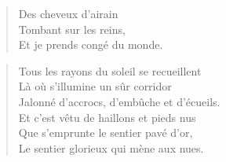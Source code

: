 \begin{verse}\haikuII
  Des cheveux d’airain\\  %
  Tombant sur les reins,\\  %
  Et je prends congé du monde. %
\end{verse}


\begin{verse}\sizain
  Tous les rayons du soleil se recueillent\\ 
  Là où s’illumine un sûr corridor\\ 
  Jalonné d’accrocs, d’embûche et d’écueils.\\ 
  Et c’est vêtu de haillons et pieds nus\\ 
  Que s’emprunte le sentier pavé d’or,\\ 
  Le sentier glorieux qui mène aux nues. %
\end{verse}

